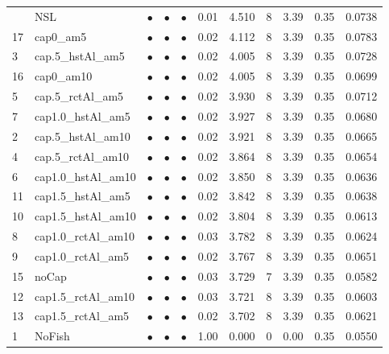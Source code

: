 \documentclass[11pt]{book}
\begin{document}
\begin{landscape}
\begin{longtable}[t]{llccccccccc}
\endhead
\
\endfoot
\bottomrule
\endlastfoot
14 & NSL & $\bullet$ & $\bullet$ & $\bullet$ & 0.01 & 4.510 & 8 & 3.39 & 0.35 & 0.0738\\
17 & cap0\_am5 & $\bullet$ & $\bullet$ & $\bullet$ & 0.02 & 4.112 & 8 & 3.39 & 0.35 & 0.0783\\
3 & cap.5\_hstAl\_am5 & $\bullet$ & $\bullet$ & $\bullet$ & 0.02 & 4.005 & 8 & 3.39 & 0.35 & 0.0728\\
16 & cap0\_am10 & $\bullet$ & $\bullet$ & $\bullet$ & 0.02 & 4.005 & 8 & 3.39 & 0.35 & 0.0699\\
5 & cap.5\_rctAl\_am5 & $\bullet$ & $\bullet$ & $\bullet$ & 0.02 & 3.930 & 8 & 3.39 & 0.35 & 0.0712\\
7 & cap1.0\_hstAl\_am5 & $\bullet$ & $\bullet$ & $\bullet$ & 0.02 & 3.927 & 8 & 3.39 & 0.35 & 0.0680\\
2 & cap.5\_hstAl\_am10 & $\bullet$ & $\bullet$ & $\bullet$ & 0.02 & 3.921 & 8 & 3.39 & 0.35 & 0.0665\\
4 & cap.5\_rctAl\_am10 & $\bullet$ & $\bullet$ & $\bullet$ & 0.02 & 3.864 & 8 & 3.39 & 0.35 & 0.0654\\
6 & cap1.0\_hstAl\_am10 & $\bullet$ & $\bullet$ & $\bullet$ & 0.02 & 3.850 & 8 & 3.39 & 0.35 & 0.0636\\
11 & cap1.5\_hstAl\_am5 & $\bullet$ & $\bullet$ & $\bullet$ & 0.02 & 3.842 & 8 & 3.39 & 0.35 & 0.0638\\
10 & cap1.5\_hstAl\_am10 & $\bullet$ & $\bullet$ & $\bullet$ & 0.02 & 3.804 & 8 & 3.39 & 0.35 & 0.0613\\
8 & cap1.0\_rctAl\_am10 & $\bullet$ & $\bullet$ & $\bullet$ & 0.03 & 3.782 & 8 & 3.39 & 0.35 & 0.0624\\
9 & cap1.0\_rctAl\_am5 & $\bullet$ & $\bullet$ & $\bullet$ & 0.02 & 3.767 & 8 & 3.39 & 0.35 & 0.0651\\
15 & noCap & $\bullet$ & $\bullet$ & $\bullet$ & 0.03 & 3.729 & 7 & 3.39 & 0.35 & 0.0582\\
12 & cap1.5\_rctAl\_am10 & $\bullet$ & $\bullet$ & $\bullet$ & 0.03 & 3.721 & 8 & 3.39 & 0.35 & 0.0603\\
13 & cap1.5\_rctAl\_am5 & $\bullet$ & $\bullet$ & $\bullet$ & 0.02 & 3.702 & 8 & 3.39 & 0.35 & 0.0621\\
1 & NoFish & $\bullet$ & $\bullet$ & $\bullet$ & 1.00 & 0.000 & 0 & 0.00 & 0.35 & 0.0550\\*
\end{longtable}
\end{landscape}
\endgroup{}

\newpage
\end{document}
